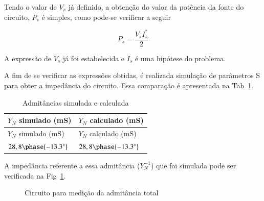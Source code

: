 \documentclass[
  number,
  preprint]{elsarticle}
\begin{document}
Tendo o valor de \(V_s\) já definido, a obtenção do valor da potência da
fonte do circuito, \(P_s\) é simples, como pode-se verificar a seguir

\[
  P_s=\frac{V_sI_s^*}{2}
\]

A expressão de \(V_s\) já foi estabelecida e \(I_s\) é uma hipótese do
problema.

A fim de se verificar as expressões obtidas, é realizada simulação de
parâmetros S para obter a impedância do circuito. Essa comparação é
apresentada na Tab~\ref{tbl-admitances}.

\begin{longtable}[]{@{}ll@{}}
\caption{Admitâncias simulada e
calculada}\label{tbl-admitances}\tabularnewline
\toprule\noalign{}
\(Y_N\) simulado (mS) & \(Y_N\) calculado (mS) \\
\midrule\noalign{}
\endfirsthead
\toprule\noalign{}
\(Y_N\) simulado (mS) & \(Y_N\) calculado (mS) \\
\midrule\noalign{}
\endhead
\bottomrule\noalign{}
\endlastfoot
\(28,8\phase{-13.3^{\circ}}\) & \(28,8\phase{-13.3^{\circ}}\) \\
\end{longtable}

A impedância referente a essa admitância (\(Y_N^{-1}\)) que foi simulada
pode ser verificada na Fig~\ref{fig-admita-smith}.

\begin{figure}


\caption{\label{fig-admita-smith}Circuito para medição da admitância
total}

\end{figure}%
\end{document}

